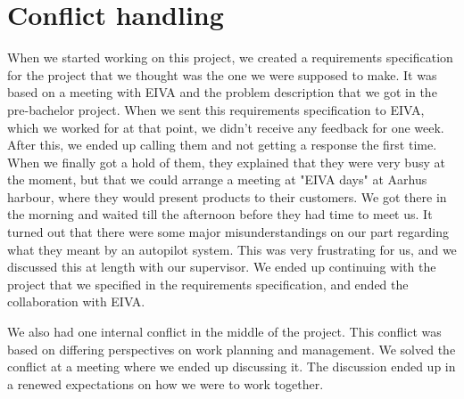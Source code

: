\chapter{Conflict handling}
When we started working on this project, we created a requirements specification for the project that we thought was the one we were supposed to make. It was based on a meeting with EIVA and the problem description that we got in the pre-bachelor project. When we sent this requirements specification to EIVA, which we worked for at that point, we didn't receive any feedback for one week. After this, we ended up calling them and not getting a response the first time. When we finally got a hold of them, they explained that they were very busy at the moment, but that we could arrange a meeting at "EIVA days" at Aarhus harbour, where they would present products to their customers. We got there in the morning and waited till the afternoon before they had time to meet us. It turned out that there were some major misunderstandings on our part regarding what they meant by an autopilot system. This was very frustrating for us, and we discussed this at length with our supervisor. We ended up continuing with the project that we specified in the requirements specification, and ended the collaboration with EIVA. 

We also had one internal conflict in the middle of the project. This conflict was based on differing perspectives on work planning and management. We solved the conflict at a meeting where we ended up discussing it. The discussion ended up in a renewed expectations on how we were to work together.

